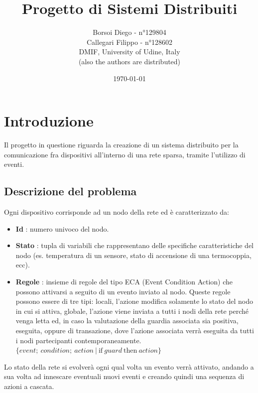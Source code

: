\documentclass[italian]{memoir}
\title{Progetto di Sistemi Distribuiti}
\author{Borsoi Diego - n°129804\\Callegari Filippo -  n°128602\\ DMIF, University of Udine,
	   Italy\\(also the authors are distributed)}
\date{\today}
\begin{document}
\maketitle
\newpage

\tableofcontents
\newpage



\chapter{Introduzione}\label{ch:intro}

Il progetto in questione riguarda la creazione di un sistema distribuito per la comunicazione
	   fra dispositivi all'interno di una rete sparsa, tramite l'utilizzo di eventi.

\section{Descrizione del problema}

Ogni dispositivo corrisponde ad un nodo della rete ed è caratterizzato da:
\begin{itemize}
\item \textbf{Id} : numero univoco del nodo.
\item \textbf{Stato} : tupla di variabili che rappresentano delle specifiche caratteristiche
	   del nodo (es. temperatura di un sensore, stato di accensione di una termocoppia,
	   ecc).
\item \textbf{Regole} : insieme di regole del tipo ECA (Event Condition Action) che
	   possono attivarsi a seguito di un evento inviato al nodo. Queste regole possono
	   essere
	   di tre tipi: locali, l'azione modifica solamente lo stato del nodo in cui si
	   attiva,
	   globale, l'azione viene inviata a tutti i nodi della rete perché venga
	   letta
	   ed, in caso la valutazione della guardia associata sia positiva, eseguita, oppure di transazione, dove l'azione associata verrà eseguita da tutti i nodi partecipanti contemporaneamente.
\center$\{event;~condition;~action~|~\text{if}~guard~\text{then}~action\}$
\end{itemize}

Lo stato della rete si evolverà ogni qual volta un evento verrà attivato, andando
	   a sua volta ad innescare eventuali nuovi eventi e creando quindi una sequenza
	   di
	   azioni a cascata.
\end{document}
